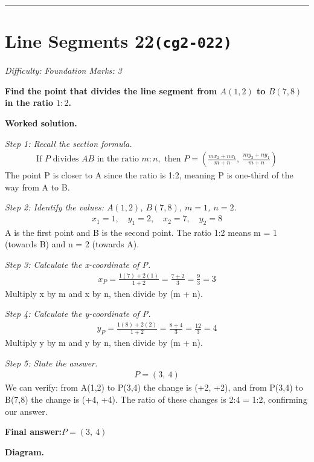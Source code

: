 \documentclass[11pt]{article}
\newcommand{\question}[1]{\par\medskip\noindent\textbf{#1}\par}
\begin{document}
\medskip\hrule

\section*{Line Segments 22\quad\small\texttt{(cg2-022)}}
\textit{Difficulty: Foundation \quad\textbar\quad Marks: 3}

\question{Find the point that divides the line segment from \( A(1, 2) \) to \( B(7, 8) \) in the ratio \( 1:2 \).}

\textbf{Worked solution.}

\textit{Step 1: Recall the section formula.}
\[\begin{gathered}
\text{If } P \text{ divides } AB \text{ in the ratio } m:n, \text{ then } P = \left(\frac{mx_2 + nx_1}{m+n},\ \frac{my_2 + ny_1}{m+n}\right)
\end{gathered}\]
The point P is closer to A since the ratio is 1:2, meaning P is one-third of the way from A to B.

\textit{Step 2: Identify the values: \( A(1,2) \), \( B(7,8) \), \( m = 1 \), \( n = 2 \).}
\[\begin{gathered}
x_1 = 1,\quad y_1 = 2,\quad x_2 = 7,\quad y_2 = 8
\end{gathered}\]
A is the first point and B is the second point. The ratio 1:2 means m = 1 (towards B) and n = 2 (towards A).

\textit{Step 3: Calculate the x-coordinate of P.}
\[\begin{gathered}
x_P = \frac{1(7) + 2(1)}{1 + 2} = \frac{7 + 2}{3} = \frac{9}{3} = 3
\end{gathered}\]
Multiply x by m and x by n, then divide by (m + n).

\textit{Step 4: Calculate the y-coordinate of P.}
\[\begin{gathered}
y_P = \frac{1(8) + 2(2)}{1 + 2} = \frac{8 + 4}{3} = \frac{12}{3} = 4
\end{gathered}\]
Multiply y by m and y by n, then divide by (m + n).

\textit{Step 5: State the answer.}
\[\begin{gathered}
P = (3,\ 4)
\end{gathered}\]
We can verify: from A(1,2) to P(3,4) the change is (+2, +2), and from P(3,4) to B(7,8) the change is (+4, +4). The ratio of these changes is 2:4 = 1:2, confirming our answer.

\begin{answerbox}
\textbf{Final answer:}\quad \(\displaystyle P = (3,\ 4)\)
\end{answerbox}
\textbf{Diagram.}
\end{document}

